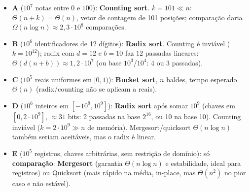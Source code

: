 \begin{prova}
\begin{itemize}
  \item \textbf{A} ($10^7$ notas entre $0$ e $100$): \textbf{Counting sort}. $k=101\ll n$: $\Theta(n+k)=\Theta(n)$, vetor de contagem de 101 posições; comparação daria $\Omega(n\log n)\approx 2{,}3\cdot10^8$ comparações.
  \item \textbf{B} ($10^6$ identificadores de 12 dígitos): \textbf{Radix sort}. Counting é inviável ($k=10^{12}$); radix com $d=12$ e $b=10$ faz $12$ passadas lineares: $\Theta(d(n+b))\approx1{,}2\cdot10^7$ (ou base $10^3$/$10^4$: 4 ou 3 passadas).
  \item \textbf{C} ($10^5$ reais uniformes em $[0,1)$): \textbf{Bucket sort}, $n$ baldes, tempo esperado $\Theta(n)$ (radix/counting não se aplicam a reais).
  \item \textbf{D} ($10^6$ inteiros em $[-10^9,10^9]$): \textbf{Radix sort} após somar $10^9$ (chaves em $[0,2\cdot10^9]$, $\approx31$ bits: 2 passadas na base $2^{16}$, ou 10 na base 10). Counting inviável ($k=2\cdot10^9\gg n$ de memória). Mergesort/quicksort $\Theta(n\log n)$ também seriam aceitáveis, mas o radix é linear.
  \item \textbf{E} ($10^5$ registros, chaves arbitrárias, sem restrição de domínio): só \textbf{comparação}: \textbf{Mergesort} (garantia $\Theta(n\log n)$ e estabilidade, ideal para registros) ou Quicksort (mais rápido na média, in-place, mas $\Theta(n^2)$ no pior caso e não estável).
\end{itemize}
\end{prova}

